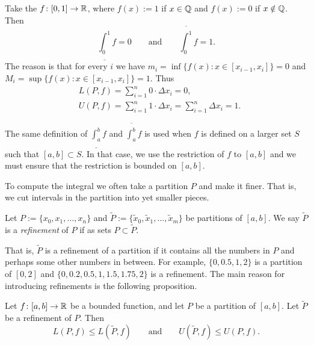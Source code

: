 \begin{example} \label{example:dirichletfunc}
Take the 
$f \colon [0,1] \to {\mathbb{R}}$, where $f(x) := 1$ if
$x \in {\mathbb{Q}}$ and $f(x) := 0$ if $x \notin {\mathbb{Q}}$.  Then
\begin{equation*}
\underline{\int_0^1} f = 0 \qquad \text{and} \qquad
\overline{\int_0^1} f = 1 .
\end{equation*}
The reason is that for every $i$ we have 
$m_i = \inf \{ f(x) : x \in [x_{i-1},x_i] \} = 0$  and
$M_i = \sup \{ f(x) : x \in [x_{i-1},x_i] \} = 1$.  Thus
\begin{align*}
& L(P,f) = \sum_{i=1}^n 0 \cdot \Delta x_i = 0 , \\
& U(P,f) = \sum_{i=1}^n 1 \cdot \Delta x_i = \sum_{i=1}^n \Delta x_i = 1  .
\end{align*}
\end{example}

\begin{remark}
The same definition of $\underline{\int_a^b} f$ and
$\overline{\int_a^b} f$
is used when $f$ is defined on a larger set $S$ such that
$[a,b] \subset S$.  In that case, we use the restriction of $f$ to $[a,b]$
and we must ensure that the restriction is bounded on $[a,b]$.
\end{remark}

To compute the integral we often take a partition $P$ and make it finer.
That is, we cut intervals in the partition into yet smaller pieces.

\begin{defn}
Let $P := \{ x_0, x_1, \ldots, x_n \}$ and
$\widetilde{P} := \{ \widetilde{x}_0, \widetilde{x}_1, \ldots, \widetilde{x}_m \}$ be
partitions of $[a,b]$.  We say $\widetilde{P}$ is a
\emph{refinement} of $P$
if as sets $P \subset \widetilde{P}$.
\end{defn}

That is, $\widetilde{P}$ is a refinement of a partition if it contains all the
numbers in $P$ and perhaps some other numbers in between.  For example,
$\{ 0, 0.5, 1, 2 \}$ is a partition of $[0,2]$ and
$\{ 0, 0.2, 0.5, 1, 1.5, 1.75, 2 \}$ is a refinement.
The main reason for introducing refinements is the following proposition.

\begin{prop} \label{prop:refinement}
Let $f \colon [a,b] \to {\mathbb{R}}$ be a bounded function, and let $P$
be a partition of $[a,b]$.  Let $\widetilde{P}$ be a refinement of $P$.
Then
\begin{equation*}
L(P,f) \leq L(\widetilde{P},f) 
\qquad \text{and} \qquad
U(\widetilde{P},f) \leq U(P,f) .
\end{equation*}
\end{prop}

